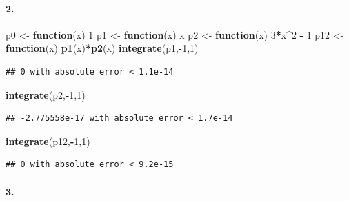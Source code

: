 \documentclass[
]{article}
\newenvironment{Shaded}{\begin{snugshade}}{\end{snugshade}}
\newcommand{\ControlFlowTok}[1]{\textcolor[rgb]{0.13,0.29,0.53}{\textbf{#1}}}
\newcommand{\DecValTok}[1]{\textcolor[rgb]{0.00,0.00,0.81}{#1}}
\newcommand{\KeywordTok}[1]{\textcolor[rgb]{0.13,0.29,0.53}{\textbf{#1}}}
\newcommand{\NormalTok}[1]{#1}
\newcommand{\OperatorTok}[1]{\textcolor[rgb]{0.81,0.36,0.00}{\textbf{#1}}}
\newcommand{\StringTok}[1]{\textcolor[rgb]{0.31,0.60,0.02}{#1}}
\begin{document}
\hypertarget{section-31}{%
\paragraph{\texorpdfstring{\textbf{2.}}{2.}}\label{section-31}}

\begin{Shaded}
\begin{Highlighting}[]
\NormalTok{p0 <-}\StringTok{ }\ControlFlowTok{function}\NormalTok{(x) }\DecValTok{1}
\NormalTok{p1 <-}\StringTok{ }\ControlFlowTok{function}\NormalTok{(x) x}
\NormalTok{p2 <-}\StringTok{ }\ControlFlowTok{function}\NormalTok{(x) }\DecValTok{3}\OperatorTok{*}\NormalTok{x}\OperatorTok{^}\DecValTok{2} \OperatorTok{-}\StringTok{ }\DecValTok{1}
\NormalTok{p12 <-}\StringTok{ }\ControlFlowTok{function}\NormalTok{(x) }\KeywordTok{p1}\NormalTok{(x)}\OperatorTok{*}\KeywordTok{p2}\NormalTok{(x)}
\KeywordTok{integrate}\NormalTok{(p1,}\OperatorTok{-}\DecValTok{1}\NormalTok{,}\DecValTok{1}\NormalTok{)}
\end{Highlighting}
\end{Shaded}

\begin{verbatim}
## 0 with absolute error < 1.1e-14
\end{verbatim}

\begin{Shaded}
\begin{Highlighting}[]
\KeywordTok{integrate}\NormalTok{(p2,}\OperatorTok{-}\DecValTok{1}\NormalTok{,}\DecValTok{1}\NormalTok{)}
\end{Highlighting}
\end{Shaded}

\begin{verbatim}
## -2.775558e-17 with absolute error < 1.7e-14
\end{verbatim}

\begin{Shaded}
\begin{Highlighting}[]
\KeywordTok{integrate}\NormalTok{(p12,}\OperatorTok{-}\DecValTok{1}\NormalTok{,}\DecValTok{1}\NormalTok{)}
\end{Highlighting}
\end{Shaded}

\begin{verbatim}
## 0 with absolute error < 9.2e-15
\end{verbatim}

\hypertarget{section-32}{%
\paragraph{\texorpdfstring{\textbf{3.}}{3.}}\label{section-32}}
\end{document}
